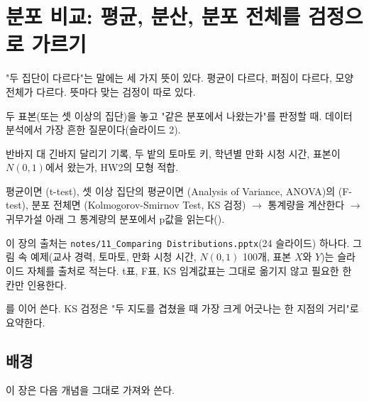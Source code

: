 \chapter{분포 비교: 평균, 분산, 분포 전체를 검정으로 가르기}
\label{ch:compare-dist}

\begin{inbrief}
  \item[Why] "두 집단이 다르다"는 말에는 세 가지 뜻이 있다. 평균이 다르다,
             퍼짐이 다르다, 모양 전체가 다르다. 뜻마다 맞는 검정이 따로
             있다.
  \item[When] 두 표본(또는 셋 이상의 집단)을 놓고 "같은 분포에서 나왔는가"를
              판정할 때. 데이터 분석에서 가장 흔한 질문이다(슬라이드 2).
  \item[Where] 반바지 대 긴바지 달리기 기록, 두 밭의 토마토 키, 학년별
               만화 시청 시간, 표본이 $N(0,1)$에서 왔는가, HW2의 모형 적합.
  \item[How] 평균이면 (t-test), 셋 이상 집단의 평균이면
             (Analysis of Variance, ANOVA)의
             (F-test), 분포 전체면
             (Kolmogorov-Smirnov Test,
             KS 검정) $\to$ 통계량을 계산한다 $\to$ 귀무가설 아래 그
             통계량의 분포에서 p값을 읽는다().
\end{inbrief}

이 장의 출처는 \texttt{notes/11\_Comparing Distributions.pptx}(24 슬라이드)
하나다. 그림 속 예제(교사 경력, 토마토, 만화 시청 시간, $N(0,1)$ 100개,
표본 $X$와 $Y$)는 슬라이드 자체를 출처로 적는다. t표, F표, KS 임계값표는
그대로 옮기지 않고 필요한 한 칸만 인용한다.

를 이어 쓴다. KS 검정은 "두 지도를 겹쳤을 때 가장 크게
어긋나는 한 지점의 거리"로 요약한다.

\section{배경}
\label{sec:cd-background}

이 장은 다음 개념을 그대로 가져와 쓴다.

